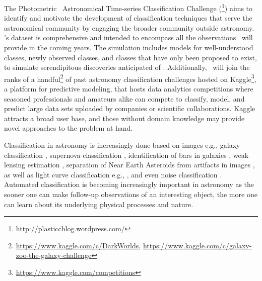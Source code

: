 The Photometric \lsst\ Astronomical Time-series Classification Challenge (\plasticc\footnote{http://plasticcblog.wordpress.com/}) aims to identify and motivate the development of classification techniques that serve the astronomical community by engaging the broader community outside astronomy.
\plasticc's dataset is comprehensive and intended to encompass all the observations \lsst\ will provide in the coming years.
The simulation includes models for well-understood classes, newly observed classes, and classes that have only been proposed to exist, to simulate serendipitous discoveries anticipated of \lsst.
Additionally, \plasticc\ will join the ranks of a handful\footnote{\url{https://www.kaggle.com/c/DarkWorlds}, \url{https://www.kaggle.com/c/galaxy-zoo-the-galaxy-challenge}} of past astronomy classification challenges hosted on Kaggle\footnote{\url{https://www.kaggle.com/competitions}}, a platform for predictive modeling, that hosts data analytics competitions where seasoned professionals and amateurs alike can compete to classify, model, and predict large data sets uploaded by companies or scientific collaborations.
Kaggle attracts a broad user base, and those without domain knowledge may provide novel approaches to the problem at hand.

Classification in astronomy is increasingly done based on images e.g., galaxy classification \citep{hoyle_measuring_2016}, supernova classification \citep{cabrera-vives_deep-hits:_2017}, identification of bars in galaxies \citep{abraham_detection_2018}, weak lensing estimation \citep[\href{http://great3challenge.info/}{Great3}][]{2014ApJS..212....5M}, separation of Near Earth Asteroids from artifacts in images \citep{morii_machine-learning_2016}, as well as light curve classification e.g., \citet{morii_machine-learning_2016, mahabal_deep-learnt_2017, zevin_gravity_2017}, and even noise classification \citep{zevin_gravity_2017, george_classification_2018}.
Automated classification \citep{djorgovski_towards_2011, djorgovski_flashes_2012, narayan_machine_2018, bloom_automating_2012} is becoming increasingly important in astronomy as the sooner one can make follow-up observations of an interesting object, the more one can learn about its underlying physical processes and nature.

